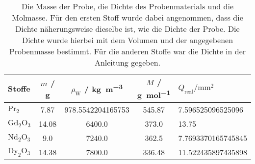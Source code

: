 \begin{table}\caption{Die Masse der Probe, die Dichte des Probenmaterials und die Molmasse. Für den ersten Stoff wurde dabei angenommen, dass die Dichte näherungsweise dieselbe ist, wie die Dichte der Probe. Die Dichte wurde hierbei mit dem Volumen und der angegebenen Probenmasse bestimmt. Für die anderen Stoffe war die Dichte in der Anleitung gegeben.}
\label{tab2}
\centering
{}
\begin{tabular}{l S S S} 
\toprule
{Stoffe} & {$m$ / \si{\gram}} & {$\rho_\text{W}$ / \si[per-mode=fraction]{\kilo\gram\per\cubic\meter}} & {$M$ / \si[per-mode=fraction]{\gram\per\mol}} & {$Q_\text{real} / \si{\milli\meter\squared}$}\\
\midrule
$\text{Pr}_2$  & 7.87 & 978.5542204165753 & 545.87  & 7.596525096525096\\
$\text{Gd}_2 \text{O}_3$         & 14.08 & 6400.0 & 373.0             & 13.75\\
$\text{Nd}_2 \text{O}_3$         & 9.0 & 7240.0 & 362.5               & 7.7693370165745845\\
$\text{Dy}_2 \text{O}_3$         & 14.38 & 7800.0 & 336.48            & 11.522435897435898\\
\bottomrule
\end{tabular}\end{table}
